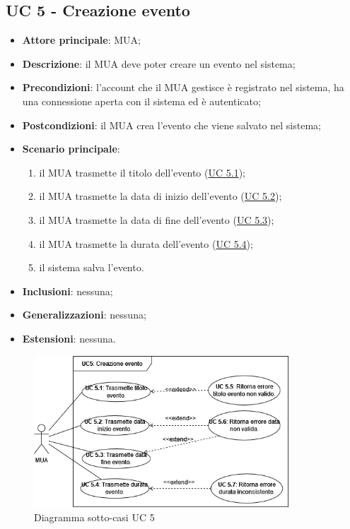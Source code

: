 \subsection{UC 5 - Creazione evento} \label{sec:UC5}
    \begin{itemize}
        \item \textbf{Attore principale}: MUA;
        \item \textbf{Descrizione}: il MUA deve poter creare un evento nel sistema;
        \item \textbf{Precondizioni}: l’account che il MUA gestisce è registrato nel sistema, ha una connessione aperta con il sistema ed è autenticato;
        \item \textbf{Postcondizioni}: il MUA crea l'evento che viene salvato nel sistema;
        \item \textbf{Scenario principale}:
            \begin{enumerate}
                \item il MUA trasmette il titolo dell'evento (\hyperref[sec:UC5.1]{UC 5.1});
                \item il MUA trasmette la data di inizio dell'evento (\hyperref[sec:UC5.2]{UC 5.2});
                \item il MUA trasmette la data di fine dell'evento (\hyperref[sec:UC5.3]{UC 5.3});
                \item il MUA trasmette la durata dell'evento (\hyperref[sec:UC5.4]{UC 5.4});
                \item il sistema salva l'evento.
            \end{enumerate}
        \item \textbf{Inclusioni}: nessuna;
        \item \textbf{Generalizzazioni}: nessuna;
        \item \textbf{Estensioni}: nessuna.
    \end{itemize}

\begin{figure}[H]
    \includegraphics[width=0.85\textwidth]{sections/uc_imgs/UC05.png}
    \centering
    \caption{Diagramma sotto-casi UC 5}
\end{figure}

